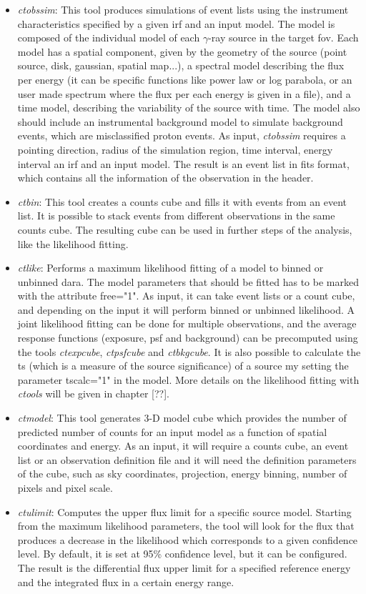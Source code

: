 \documentclass[main.tex]{subfiles}
\begin{document}
\begin{itemize}
\item \textit{ctobssim}: This tool produces simulations of event lists using the instrument characteristics specified by a given \gls{irf} and an input model. The model is composed of the individual model of each $\gamma$-ray source in the target \gls{fov}. Each model has a spatial component, given by the geometry of the source (point source, disk, gaussian, spatial map...), a spectral model describing the flux per energy (it can be specific functions like power law or log parabola, or an user made spectrum where the flux per each energy is given in a file), and a time model, describing the variability of the source with time. The model also should include an instrumental background model to simulate background events, which are misclassified proton events.
  As input, \textit{ctobssim} requires a pointing direction, radius of the simulation region, time interval, energy interval an \gls{irf} and an input model. The result is an event list in fits format, which contains all the information of the observation in the header.
\item \textit{ctbin}: This tool creates a counts cube and fills it with events from an event list. It is possible to stack events from different observations in the same counts cube. The resulting cube can be used in further steps of the analysis, like the likelihood fitting.
\item \textit{ctlike}: Performs a maximum likelihood fitting of a model to binned or unbinned dara. The model parameters that should be fitted has to be marked with the attribute free="1". As input, it can take event lists or a count cube, and depending on the input it will perform binned or unbinned likelihood. A joint likelihood fitting can be done for multiple observations, and the average response functions (exposure, \gls{psf} and background) can be precomputed using the tools \textit{ctexpcube}, \textit{ctpsfcube} and \textit{ctbkgcube}. It is also possible to calculate the \gls{ts} (which is a measure of the source significance) of a source my setting the parameter tscalc="1" in the model. More details on the likelihood fitting with \textit{ctools} will be given in chapter [??].
\item \textit{ctmodel}: This tool generates 3-D model cube which provides the number of predicted number of counts for an input model as a function of spatial coordinates and energy. As an input, it will require a counts cube, an event list or an observation definition file and it will need the definition parameters of the cube, such as sky coordinates, projection, energy binning, number of pixels and pixel scale.
\item \textit{ctulimit}: Computes the upper flux limit for a specific source model. Starting from the maximum likelihood parameters, the tool will look for the flux that produces a decrease in the likelihood which corresponds to a given confidence level. By default, it is set at 95\% confidence level, but it can be configured. The result is the differential flux upper limit for a specified reference energy and the integrated flux in a certain energy range.
  
\end{itemize}
\end{document}
